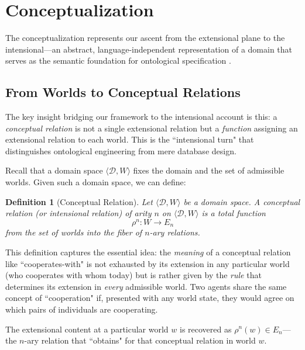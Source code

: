 \documentclass[12pt,a4paper]{article}
\newtheorem{definition}{Definition}[section]
\newcommand{\domain}{\mathcal{D}}
\begin{document}
\section{Conceptualization}

The conceptualization represents our ascent from the extensional plane to the intensional---an abstract, language-independent representation of a domain that serves as the semantic foundation for ontological specification \citep{gruber1995, guarino1998}.

\subsection{From Worlds to Conceptual Relations}

The key insight bridging our framework to the intensional account is this: a \emph{conceptual relation} is not a single extensional relation but a \emph{function} assigning an extensional relation to each world. This is the ``intensional turn" that distinguishes ontological engineering from mere database design.

Recall that a domain space $\langle \domain, W \rangle$ fixes the domain and the set of admissible worlds. Given such a domain space, we can define:

\begin{definition}[Conceptual Relation]
\label{def:conceptual-relation}
Let $\langle \domain, W \rangle$ be a domain space. A \emph{conceptual relation} (or \emph{intensional relation}) of arity $n$ on $\langle \domain, W \rangle$ is a total function
$$
\rho^n : W \to E_n
$$
from the set of worlds into the fiber of $n$-ary relations.
\end{definition}

This definition captures the essential idea: the \emph{meaning} of a conceptual relation like ``cooperates-with" is not exhausted by its extension in any particular world (who cooperates with whom today) but is rather given by the \emph{rule} that determines its extension in \emph{every} admissible world. Two agents share the same concept of ``cooperation" if, presented with any world state, they would agree on which pairs of individuals are cooperating.

The extensional content at a particular world $w$ is recovered as $\rho^n(w) \in E_n$---the $n$-ary relation that ``obtains" for that conceptual relation in world $w$.
\end{document}
